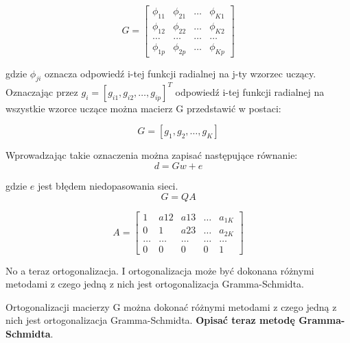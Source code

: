\begin{equation}
G = \begin{bmatrix}
\phi_{11} & \phi_{21} & \hdots & \phi_{K1} \\
\phi_{12} & \phi_{22} & \hdots & \phi_{K2} \\
\hdots    & \hdots    & \hdots & \hdots    \\
\phi_{1p} & \phi_{2p} & \hdots & \phi_{Kp}
\end{bmatrix}
\end{equation}

gdzie $\phi_{ji}$ oznacza odpowiedź i-tej funkcji radialnej na j-ty wzorzec uczący. Oznaczając przez $g_i = [g_{i1}, g_{i2}, \hdots, g_{ip}]^T$ odpowiedź i-tej funkcji radialnej na wszystkie wzorce uczące można macierz G przedstawić w postaci:

\begin{equation}G = [g_1, g_2, \hdots, g_K] \end{equation}

Wprowadzając takie oznaczenia można zapisać następujące równanie:
\begin{equation}d = Gw + e\end{equation}

gdzie $e$ jest błędem niedopasowania sieci.
\begin{equation}G = QA\end{equation}

\begin{equation}
A = \begin{bmatrix}
1      & a{12}  & a{13}  & \hdots & a_{1K} \\
0      & 1      & a{23}  & \hdots & a_{2K} \\
\hdots & \hdots & \hdots & \hdots & \hdots \\
0      & 0      & 0      & 0      & 1     
\end{bmatrix}
\end{equation}

No a teraz ortogonalizacja. I ortogonalizacja może być dokonana różnymi metodami z czego jedną z nich jest ortogonalizacja Gramma-Schmidta.

Ortogonalizacji macierzy G można dokonać różnymi metodami z czego jedną z nich jest ortogonalizacja Gramma-Schmidta. \textbf{Opisać teraz metodę Gramma-Schmidta}.


\newpage

